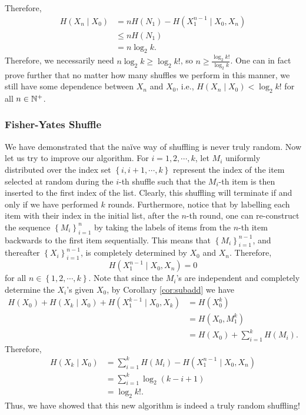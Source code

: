 \documentclass[math]{amznotes}
\theoremstyle{remark}
\begin{document}
Therefore, 
\begin{align*}
    H\left(X_n \mid X_0\right) & = nH\left(N_1\right) - H\left(X_1^{n - 1} \mid X_0, X_n\right) \\
    & \leq nH\left(N_1\right) \\
    & = n\log_2 k.
\end{align*}
Therefore, we necessarily need $n\log_2 k \geq \log_2 k!$, so $n \geq \frac{\log_2 k!}{\log_2 k}$. One can in fact prove further that no matter how many shuffles we perform in this manner, we still have some dependence between $X_n$ and $X_0$, i.e., $H\left(X_n \mid X_0\right) < \log_2 k!$ for all $n \in \mathbb{N}^+$.
\subsubsection{Fisher-Yates Shuffle}
We have demonstrated that the na\"{i}ve way of shuffling is never truly random. Now let us try to improve our algorithm. For $i = 1, 2, \cdots, k$, let $M_i$ uniformly distributed over the index set $\left\{i, i + 1, \cdots, k\right\}$ represent the index of the item selected at random during the $i$-th shuffle such that the $M_i$-th item is then inserted to the first index of the list. Clearly, this shuffling will terminate if and only if we have performed $k$ rounds. Furthermore, notice that by labelling each item with their index in the initial list, after the $n$-th round, one can re-construct the sequence $\left\{M_i\right\}_{i = 1}^n$ by taking the labels of items from the $n$-th item backwards to the first item sequentially. This means that $\left\{M_i\right\}_{i = 1}^{n - 1}$, and thereafter $\left\{X_i\right\}_{i = 1}^{n - 1}$, is completely determined by $X_0$ and $X_n$. Therefore,
\begin{equation*}
    H\left(X_1^{n - 1} \mid X_0, X_n\right) = 0
\end{equation*}
for all $n \in \left\{1, 2, \cdots, k\right\}$. Note that since the $M_i$'s are independent and completely determine the $X_i$'s given $X_0$, by Corollary \ref{cor:subadd} we have
\begin{align*}
    H\left(X_0\right) + H\left(X_k \mid X_0\right) + H\left(X_1^{k - 1} \mid X_0, X_k\right) & = H\left(X_0^k\right) \\
    & = H\left(X_0, M_1^k\right) \\
    & = H\left(X_0\right) + \sum_{i = 1}^{k}H\left(M_i\right).
\end{align*}
Therefore, 
\begin{align*}
    H\left(X_k \mid X_0\right) & = \sum_{i = 1}^{k}H\left(M_i\right) - H\left(X_1^{n - 1} \mid X_0, X_n\right) \\
    & = \sum_{i = 1}^{k}\log_2\left(k - i + 1\right) \\
    & = \log_2 k!.
\end{align*}
Thus, we have showed that this new algorithm is indeed a truly random shuffling!
\end{document}
